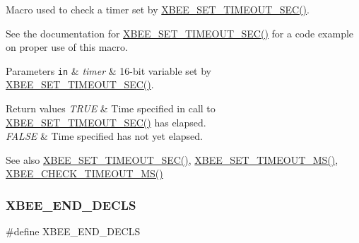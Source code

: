 Macro used to check a timer set by \hyperlink{group__hal_ga6adb5c9e19c84a261c569ff4d77d1170}{X\+B\+E\+E\+\_\+\+S\+E\+T\+\_\+\+T\+I\+M\+E\+O\+U\+T\+\_\+\+S\+E\+C()}. 

See the documentation for \hyperlink{group__hal_ga6adb5c9e19c84a261c569ff4d77d1170}{X\+B\+E\+E\+\_\+\+S\+E\+T\+\_\+\+T\+I\+M\+E\+O\+U\+T\+\_\+\+S\+E\+C()} for a code example on proper use of this macro.


\begin{DoxyParams}[1]{Parameters}
\mbox{\tt in}  & {\em timer} & 16-\/bit variable set by \hyperlink{group__hal_ga6adb5c9e19c84a261c569ff4d77d1170}{X\+B\+E\+E\+\_\+\+S\+E\+T\+\_\+\+T\+I\+M\+E\+O\+U\+T\+\_\+\+S\+E\+C()}.\\
\hline
\end{DoxyParams}

\begin{DoxyRetVals}{Return values}
{\em T\+R\+UE} & Time specified in call to \hyperlink{group__hal_ga6adb5c9e19c84a261c569ff4d77d1170}{X\+B\+E\+E\+\_\+\+S\+E\+T\+\_\+\+T\+I\+M\+E\+O\+U\+T\+\_\+\+S\+E\+C()} has elapsed. \\
\hline
{\em F\+A\+L\+SE} & Time specified has not yet elapsed.\\
\hline
\end{DoxyRetVals}
\begin{DoxySeeAlso}{See also}
\hyperlink{group__hal_ga6adb5c9e19c84a261c569ff4d77d1170}{X\+B\+E\+E\+\_\+\+S\+E\+T\+\_\+\+T\+I\+M\+E\+O\+U\+T\+\_\+\+S\+E\+C()}, \hyperlink{group__hal_ga848a9903fa7859d84cb22aeddde4c42f}{X\+B\+E\+E\+\_\+\+S\+E\+T\+\_\+\+T\+I\+M\+E\+O\+U\+T\+\_\+\+M\+S()}, \hyperlink{group__hal_gac3485c3c34a50a5a35d553cc743d163e}{X\+B\+E\+E\+\_\+\+C\+H\+E\+C\+K\+\_\+\+T\+I\+M\+E\+O\+U\+T\+\_\+\+M\+S()} 
\end{DoxySeeAlso}
\mbox{\label{group__hal_ga8d7f5a691878e9ffb7da396899581062}} 
\subsubsection{\texorpdfstring{X\+B\+E\+E\+\_\+\+E\+N\+D\+\_\+\+D\+E\+C\+LS}{XBEE\_END\_DECLS}}
{\footnotesize\ttfamily \#define X\+B\+E\+E\+\_\+\+E\+N\+D\+\_\+\+D\+E\+C\+LS}



